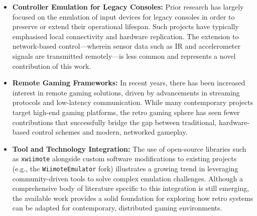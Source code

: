 \begin{itemize}
	\item \textbf{Controller Emulation for Legacy Consoles:} Prior research has largely focused on the emulation of input devices for legacy consoles in order to preserve or extend their operational lifespan. Such projects have typically emphasised local connectivity and hardware replication. The extension to network-based control—wherein sensor data such as IR and accelerometer signals are transmitted remotely—is less common and represents a novel contribution of this work.

	\item \textbf{Remote Gaming Frameworks:} In recent years, there has been increased interest in remote gaming solutions, driven by advancements in streaming protocols and low-latency communication. While many contemporary projects target high-end gaming platforms, the retro gaming sphere has seen fewer contributions that successfully bridge the gap between traditional, hardware-based control schemes and modern, networked gameplay.

	\item \textbf{Tool and Technology Integration:} The use of open-source libraries such as \texttt{xwiimote} alongside custom software modifications to existing projects (e.g., the \texttt{WiimoteEmulator} fork) illustrates a growing trend in leveraging community-driven tools to solve complex emulation challenges. Although a comprehensive body of literature specific to this integration is still emerging, the available work provides a solid foundation for exploring how retro systems can be adapted for contemporary, distributed gaming environments.



\end{itemize}
